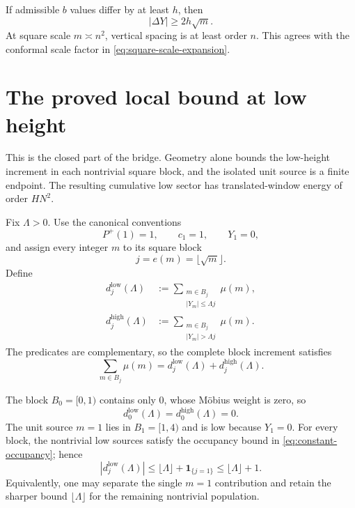 \documentclass[11pt]{article}
\theoremstyle{definition}
\newcommand{\Pplus}{P^{+}}
\newcommand{\1}{\mathbf{1}}
\begin{document}
If admissible $b$ values differ by at least $h$, then
\begin{equation}
 |\Delta Y|\ge2h\sqrt m.
 \label{eq:Y-spacing}
\end{equation}
At square scale $m\asymp n^2$, vertical spacing is at least order $n$.  This agrees with the conformal scale factor in \cref{eq:square-scale-expansion}.


\section{The proved local bound at low height}
\label{sec:low-cubic}

This is the closed part of the bridge.  Geometry alone bounds the low-height increment in each nontrivial square block, and the isolated unit source is a finite endpoint.  The resulting cumulative low sector has translated-window energy of order $HN^2$.

Fix $\Lambda>0$.  Use the canonical conventions
\[
 \Pplus(1)=1,\qquad c_1=1,\qquad Y_1=0,
\]
and assign every integer $m$ to its square block
\begin{equation}
 j=e(m)=\lfloor\sqrt m\rfloor.
 \label{eq:entry-block}
\end{equation}
Define
\begin{align}
 d_j^{\mathrm{low}}(\Lambda)
 &:={}
 \sum_{\substack{m\in B_j\\|Y_m|\le\Lambda j}}\mu(m),
 \label{eq:low-block-increment}\\
 d_j^{\mathrm{high}}(\Lambda)
 &:={}
 \sum_{\substack{m\in B_j\\|Y_m|>\Lambda j}}\mu(m).
 \label{eq:high-block-increment}
\end{align}
The predicates are complementary, so the complete block increment satisfies
\begin{equation}
 \sum_{m\in B_j}\mu(m)
 =d_j^{\mathrm{low}}(\Lambda)+d_j^{\mathrm{high}}(\Lambda).
 \label{eq:block-low-high-recombination}
\end{equation}

The block $B_0=[0,1)$ contains only $0$, whose M\"obius weight is zero, so
\begin{equation}
 d_0^{\mathrm{low}}(\Lambda)=d_0^{\mathrm{high}}(\Lambda)=0.
 \label{eq:zero-block-endpoint}
\end{equation}
The unit source $m=1$ lies in $B_1=[1,4)$ and is low because $Y_1=0$.  For every block, the nontrivial low sources satisfy the occupancy bound in \cref{eq:constant-occupancy}; hence
\begin{equation}
 \boxed{
 |d_j^{\mathrm{low}}(\Lambda)|
 \le \lfloor\Lambda\rfloor+\1_{\{j=1\}}
 \le \lfloor\Lambda\rfloor+1.
 }
 \label{eq:low-block-bound}
\end{equation}
Equivalently, one may separate the single $m=1$ contribution and retain the sharper bound $\lfloor\Lambda\rfloor$ for the remaining nontrivial population.
\end{document}
